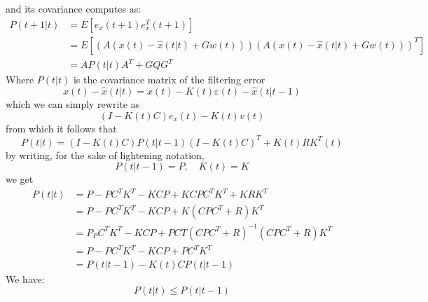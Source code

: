 \documentclass{book}
\theoremstyle{definition}
\theoremstyle{remark}
\theoremstyle{remark}
\begin{document}
and its covariance computes as: 
\begin{align*}
    P(t+1|t) & = E[e_x(t+1)e_x^T(t+1)] \\
             & = E[(A(x(t)-\hat{x}(t|t)+Gw(t)))(A(x(t)-\hat{x}(t|t)+Gw(t)))^T] \\
             & = AP(t|t)A^T + GQG^T
\end{align*}
Where $P(t|t)$ is the covariance matrix of the filtering error 
\[
    x(t) -\hat{x}(t|t) = x(t) - K(t)\varepsilon(t)-\hat{x}(t|t-1)
\]
which we can simply rewrite as 
\[
    (I-K(t)C)e_x(t)-K(t)v(t)
\]
from which it follows that 
\[
    P(t|t) = (I - K(t) C) P(t|t - 1) (I - K(t) C)^T + K(t)RK^T (t)
\]
by writing, for the sake of lightening notation, \[P(t|t-1)=P, \quad K(t)=K\]
we get
\begin{align*}
    P(t|t)& = P -PC^TK^T-KCP+KCPC^TK^T+KRK^T\\
          & = P-PC^TK^T-KCP+K(CPC^T+R)K^T \\
          & = P _ PC^TK^T-KCP+PCT(CPC^T+R)^{-1}(CPC^T+R)K^T\\
          & = P-PC^TK^T - KCP + PC^TK^T \\
          & = P(t|t-1) - K(t)CP(t|t-1)
\end{align*}
We have: 
\[
    P(t|t)\leq P(t|t-1)
\]
\end{document}
